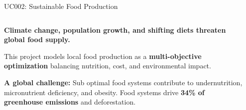 \documentclass[aspectratio=169,10pt]{beamer}
\begin{document}
\begin{frame}{UC002: Sustainable Food Production}

    
    \begin{columns}[T]
        \begin{column}{0.56\textwidth}
            \vspace{-0.5cm}
            \textbf{\footnotesize Climate change, population growth, and shifting diets \textcolor{alertRed}{threaten global food supply}.}
            
            \vspace{0.15cm}
            {\scriptsize
            This project models local food production as a \textbf{multi-objective optimization} balancing nutrition, cost, and environmental impact.}
            

            \begin{tcolorbox}[
                enhanced,
                colback=alertRed!10,
                colframe=alertRed,
                boxrule=1pt,
                arc=3pt,
                left=4pt,right=4pt,top=3pt,bottom=3pt,
                fontupper=\footnotesize
            ]
                \textbf{A global challenge:} Sub optimal food systems contribute to undernutrition, micronutrient deficiency, and obesity. Food systems drive \textbf{34\% of greenhouse emissions} and deforestation.
            \end{tcolorbox}
            
            \vspace{0.25cm}
        \end{column}
        
        \begin{column}{0.42\textwidth}
            \vspace{-0.9cm}
            \centering
\end{column}
\end{columns}
\end{frame}
\end{document}
